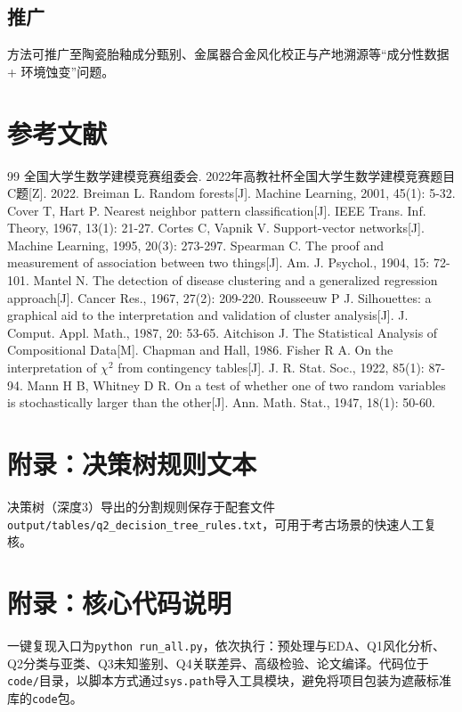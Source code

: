 \documentclass[UTF8,a4paper,12pt]{ctexart}
\begin{document}
\subsection{推广}
方法可推广至陶瓷胎釉成分甄别、金属器合金风化校正与产地溯源等“成分性数据 + 环境蚀变”问题。

\section{参考文献}
\begin{thebibliography}{99}
 全国大学生数学建模竞赛组委会. 2022年高教社杯全国大学生数学建模竞赛题目C题[Z]. 2022.
 Breiman L. Random forests[J]. Machine Learning, 2001, 45(1): 5-32.
 Cover T, Hart P. Nearest neighbor pattern classification[J]. IEEE Trans. Inf. Theory, 1967, 13(1): 21-27.
 Cortes C, Vapnik V. Support-vector networks[J]. Machine Learning, 1995, 20(3): 273-297.
 Spearman C. The proof and measurement of association between two things[J]. Am. J. Psychol., 1904, 15: 72-101.
 Mantel N. The detection of disease clustering and a generalized regression approach[J]. Cancer Res., 1967, 27(2): 209-220.
 Rousseeuw P J. Silhouettes: a graphical aid to the interpretation and validation of cluster analysis[J]. J. Comput. Appl. Math., 1987, 20: 53-65.
 Aitchison J. The Statistical Analysis of Compositional Data[M]. Chapman and Hall, 1986.
 Fisher R A. On the interpretation of $\chi^2$ from contingency tables[J]. J. R. Stat. Soc., 1922, 85(1): 87-94.
 Mann H B, Whitney D R. On a test of whether one of two random variables is stochastically larger than the other[J]. Ann. Math. Stat., 1947, 18(1): 50-60.
\end{thebibliography}

\appendix
\section{附录：决策树规则文本}
决策树（深度3）导出的分割规则保存于配套文件\texttt{output/tables/q2\_decision\_tree\_rules.txt}，可用于考古场景的快速人工复核。

\section{附录：核心代码说明}
一键复现入口为\texttt{python run\_all.py}，依次执行：预处理与EDA、Q1风化分析、Q2分类与亚类、Q3未知鉴别、Q4关联差异、高级检验、论文编译。代码位于\texttt{code/}目录，以脚本方式通过\texttt{sys.path}导入工具模块，避免将项目包装为遮蔽标准库的\texttt{code}包。
\end{document}
